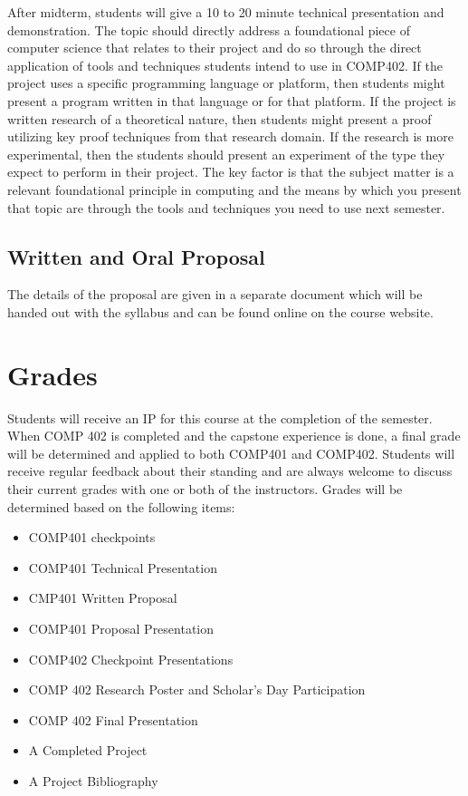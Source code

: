 \documentclass[10pt]{article}
\begin{document}
After midterm, students will give a 10 to 20 minute technical presentation and demonstration. The topic should directly address a foundational piece of computer science that relates to their project and do so through the direct application of tools and techniques students intend to use in COMP402. If the project uses a specific programming language or platform, then students might present a program written in that language or for that platform. If the project is written research of a theoretical nature, then students might present a proof utilizing key proof techniques from that research domain. If the research is more experimental, then the students should present an experiment of the type they expect to perform in their project. The key factor is that the subject matter is a relevant foundational principle in computing and the means by which you present that topic are through the tools and techniques you need to use next semester. 


\subsection{Written and Oral Proposal}

The details of the proposal are given in a separate document which will be handed out with the syllabus and can be found online on the course website.

\section{Grades}

Students will receive an IP for this course at the completion of the semester. When COMP 402 is completed and the capstone experience is done, a final grade will be determined and applied to both COMP401 and COMP402. Students will receive regular feedback about their standing and are always welcome to discuss their current grades with one or both of the instructors. Grades will be determined based on the following items:
\begin{itemize}
\item COMP401 checkpoints
\item COMP401 Technical Presentation
\item CMP401 Written Proposal
\item COMP401 Proposal Presentation
\item COMP402 Checkpoint Presentations 
\item COMP 402 Research Poster and Scholar's Day Participation 
\item COMP 402 Final Presentation 
\item A Completed Project
\item A Project Bibliography
\end{itemize}
\end{document}
